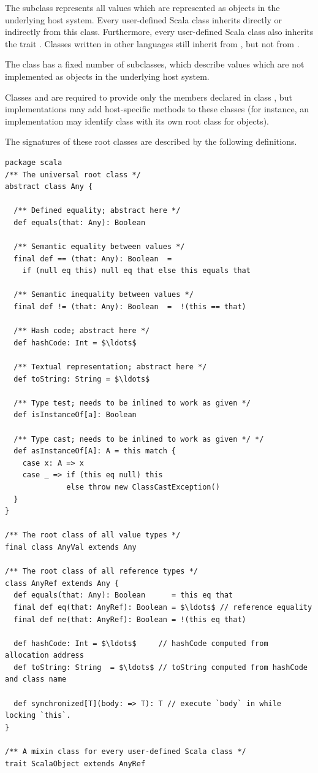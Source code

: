 The subclass  represents all values which are represented
as objects in the underlying host system. Every user-defined Scala
class inherits directly or indirectly from this class. Furthermore,
every user-defined Scala class also inherits the trait
.  Classes written in other languages still
inherit from , but not from
.

The class  has a fixed number of subclasses, which describe
values which are not implemented as objects in the underlying host
system.

Classes  and  are required to provide only
the members declared in class , but implementations may add
host-specific methods to these classes (for instance, an
implementation may identify class  with its own root
class for objects).

The signatures of these root classes are described by the following
definitions.

\begin{lstlisting}
package scala 
/** The universal root class */
abstract class Any {

  /** Defined equality; abstract here */
  def equals(that: Any): Boolean 

  /** Semantic equality between values */
  final def == (that: Any): Boolean  =  
    if (null eq this) null eq that else this equals that

  /** Semantic inequality between values */
  final def != (that: Any): Boolean  =  !(this == that)

  /** Hash code; abstract here */
  def hashCode: Int = $\ldots$

  /** Textual representation; abstract here */
  def toString: String = $\ldots$

  /** Type test; needs to be inlined to work as given */
  def isInstanceOf[a]: Boolean

  /** Type cast; needs to be inlined to work as given */ */
  def asInstanceOf[A]: A = this match {
    case x: A => x
    case _ => if (this eq null) this
              else throw new ClassCastException()
  }
}

/** The root class of all value types */
final class AnyVal extends Any 

/** The root class of all reference types */
class AnyRef extends Any {
  def equals(that: Any): Boolean      = this eq that 
  final def eq(that: AnyRef): Boolean = $\ldots$ // reference equality
  final def ne(that: AnyRef): Boolean = !(this eq that)

  def hashCode: Int = $\ldots$     // hashCode computed from allocation address
  def toString: String  = $\ldots$ // toString computed from hashCode and class name

  def synchronized[T](body: => T): T // execute `body` in while locking `this`.
}                           

/** A mixin class for every user-defined Scala class */
trait ScalaObject extends AnyRef 
\end{lstlisting}

